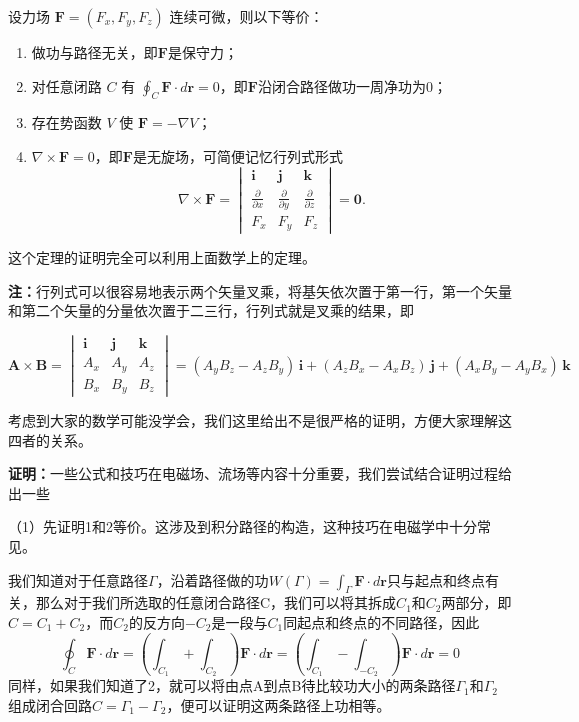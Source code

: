 \documentclass[UTF-8]{ctexart}
\begin{document}
\begin{tcolorbox}[colback=white!5!white, colframe=green!50!black, title=保守力的等价定义]
设力场 \(\mathbf{F}=(F_x,F_y,F_z)\) 连续可微，则以下等价：
\begin{enumerate}
\item 做功与路径无关，即$\mathbf{F}$是保守力；
\item 对任意闭路 \(C\) 有 \(\oint_C \mathbf{F}\cdot d\mathbf{r}=0\)，即$\mathbf{F}$沿闭合路径做功一周净功为0；
\item 存在势函数 \(V\) 使 \(\mathbf{F}=-\nabla V\)；
\item \(\nabla\times\mathbf{F}=0\)，即$\mathbf{F}$是无旋场，可简便记忆行列式形式
\[\nabla\times\mathbf{F} = 
\begin{vmatrix}
\mathbf{i} & \mathbf{j} & \mathbf{k} \\[2pt]
\frac{\partial}{\partial x} & \frac{\partial}{\partial y} & \frac{\partial}{\partial z} \\[2pt]
F_x & F_y & F_z
\end{vmatrix} = \mathbf{0}.
\]
\end{enumerate}
\end{tcolorbox}

这个定理的证明完全可以利用上面数学上的定理。

\noindent\textbf{注：}行列式可以很容易地表示两个矢量叉乘，将基矢依次置于第一行，第一个矢量和第二个矢量的分量依次置于二三行，行列式就是叉乘的结果，即

\[
\mathbf{A} \times \mathbf{B} = 
\begin{vmatrix}
\mathbf{i} & \mathbf{j} & \mathbf{k} \\
A_x & A_y & A_z \\
B_x & B_y & B_z
\end{vmatrix}
= (A_y B_z - A_z B_y)\,\mathbf{i} + (A_z B_x - A_x B_z)\,\mathbf{j} + (A_x B_y - A_y B_x)\,\mathbf{k}
\]

考虑到大家的数学可能没学会，我们这里给出不是很严格的证明，方便大家理解这四者的关系。

\noindent\textbf{证明：}一些公式和技巧在电磁场、流场等内容十分重要，我们尝试结合证明过程给出一些

 \noindent（1）先证明1和2等价。这涉及到积分路径的构造，这种技巧在电磁学中十分常见。

我们知道对于任意路径$\Gamma$，沿着路径做的功$ W(\Gamma) = \int_{\Gamma}  \mathbf{F}\cdot d\mathbf{r} $只与起点和终点有关，那么对于我们所选取的任意闭合路径C，我们可以将其拆成$C_1$和$C_2$两部分，即$C = C_1 +C_2$，而$C_2$的反方向$-C_2$是一段与$C_1$同起点和终点的不同路径，因此
\[
\oint_C \mathbf{F}\cdot d\mathbf{r}=( \int_{C_1} + \int_{C_2} )\mathbf{F}\cdot d\mathbf{r} = ( \int_{C_1} - \int_{- C_2} )\mathbf{F}\cdot d\mathbf{r} = 0
\]
同样，如果我们知道了2，就可以将由点A到点B待比较功大小的两条路径$\Gamma_1$和$\Gamma_2$组成闭合回路$C = \Gamma_1 - \Gamma_2$，便可以证明这两条路径上功相等。
\end{document}
